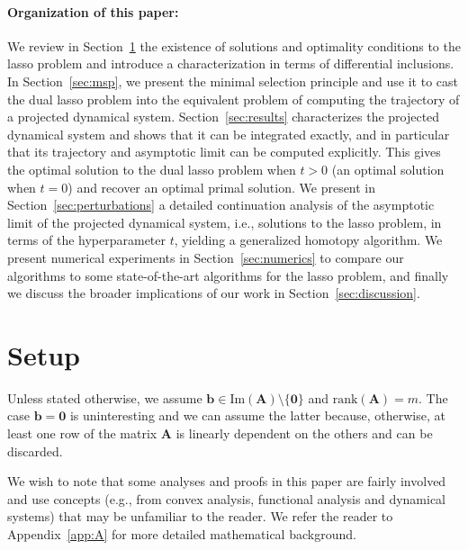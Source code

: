 \documentclass[11pt]{article}
\numberwithin{prop}{section}
\numberwithin{lem}{section}
\numberwithin{rem}{section}
\numberwithin{cor}{section}
\numberwithin{thm}{section}
\numberwithin{defn}{section}
\numberwithin{fact}{section}
\theoremstyle{plain}
\def\bb {\boldsymbol{b}}
\newcommand{\matr}[1]{\bm{#1}}
\newcommand{\rank}[1]{\mathrm{rank}({#1})}
\begin{document}
\paragraph{Organization of this paper:} We review in Section~\ref{sec:setup} the existence of solutions and optimality conditions to the lasso problem and introduce a characterization in terms of differential inclusions. In Section~\ref{sec:msp}, we present the minimal selection principle and use it to cast the dual lasso problem into the equivalent problem of computing the trajectory of a projected dynamical system. Section~\ref{sec:results} characterizes the projected dynamical system and shows that it can be integrated exactly, and in particular that its trajectory and asymptotic limit can be computed explicitly. This gives the optimal solution to the dual lasso problem when $t>0$ (an optimal solution when $t=0$) and recover an optimal primal solution. We present in Section~\ref{sec:perturbations} a detailed continuation analysis of the asymptotic limit of the projected dynamical system, i.e., solutions to the lasso problem, in terms of the hyperparameter $t$, yielding a generalized homotopy algorithm. We present numerical experiments in Section~\ref{sec:numerics} to compare our algorithms to some state-of-the-art algorithms for the lasso problem, and finally we discuss the broader implications of our work in Section~\ref{sec:discussion}. %
\section{Setup}\label{sec:setup}
Unless stated otherwise, we assume $\bb \in \text{Im}(\matr{A})\setminus\{\boldsymbol{0}\}$ and $\rank{\matr{A}} = m$. The case $\bb = \boldsymbol{0}$ is uninteresting and we can assume the latter because, otherwise, at least one row of the matrix $\matr{A}$ is linearly dependent on the others and can be discarded. 

We wish to note that some analyses and proofs in this paper are fairly involved and use concepts (e.g., from convex analysis, functional analysis and dynamical systems) that may be unfamiliar to the reader. We refer the reader to Appendix~\ref{app:A} for more detailed mathematical background.


\end{document}
